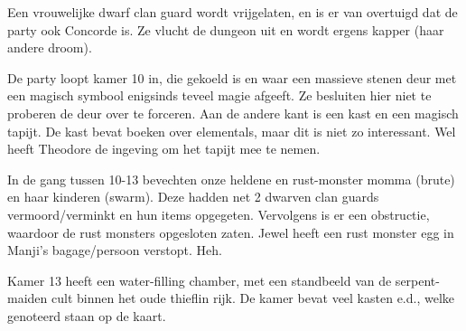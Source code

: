 Een vrouwelijke dwarf clan guard wordt vrijgelaten, en is er van overtuigd dat de party ook Concorde is. Ze vlucht de dungeon uit en wordt ergens kapper (haar andere droom).

De party loopt kamer 10 in, die gekoeld is en waar een massieve stenen deur met een magisch symbool enigsinds teveel magie afgeeft. Ze besluiten hier niet te proberen de deur over te forceren. Aan de andere kant is een kast en een magisch tapijt. De kast bevat boeken over elementals, maar dit is niet zo interessant. Wel heeft Theodore de ingeving om het tapijt mee te nemen.

In de gang tussen 10-13 bevechten onze heldene en rust-monster momma (brute) en haar kinderen (swarm). Deze hadden net 2 dwarven clan guards vermoord/verminkt en hun items opgegeten. Vervolgens is er een obstructie, waardoor de rust monsters opgesloten zaten. Jewel heeft een rust monster egg in Manji's bagage/persoon verstopt. Heh.

Kamer 13 heeft een water-filling chamber, met een standbeeld van de serpent-maiden cult binnen het oude thieflin rijk. De kamer bevat veel kasten e.d., welke genoteerd staan op de kaart.